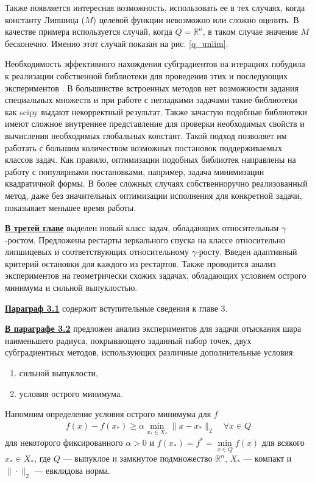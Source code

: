 Также появляется интересная возможность, использовать ее в тех случаях, когда константу Липшица ($M$) целевой функции невозможно или сложно оценить. В качестве примера используется случай, когда $Q = \mathbb{R}^n$, в таком случае значение $M$ бесконечно. Именно этот случай показан на рис. \ref{q_unlim}. 

Необходимость эффективного нахождения субградиентов на итерациях побудила к реализации собственной библиотеки для проведения этих и последующих экспериментов \cite{mygit}. В большинстве встроенных методов нет возможности задания специальных  множеств и при работе с негладкими задачами такие библиотеки как scipy выдают некорректный результат. Также зачастую подобные библиотеки имеют сложное внутреннее представление для проверки необходимых свойств и вычисления необходимых глобальных констант. Такой подход позволяет им работать с большим количеством возможных постановок поддерживаемых классов задач. Как правило, оптимизации подобных библиотек направлены на работу с популярными постановками, например, задача минимизации квадратичной формы. В более сложных случаях собственноручно реализованный метод, даже без значительных оптимизации исполнения для конкретной задачи, показывает меньшее время работы. 


\underline{\textbf{В третей главе}} выделен новый класс задач, обладающих относительным $\gamma$-ростом. Предложены рестарты зеркального спуска на классе относительно липшицевых и соответствующих относительному $\gamma$-росту. Введен адаптивный критерий остановки для каждого из рестартов. Также проводится анализ экспериментов на геометрически схожих задачах, обладающих условием острого минимума и сильной выпуклостью. 

\underline{\textbf{Параграф 3.1}} содержит вступительные сведения к главе 3. 

\underline{\textbf{В параграфе 3.2}} предложен анализ экспериментов для задачи отыскания шара наименьшего радиуса, покрывающего заданный набор точек, двух субградиентных методов, использующих различные дополнительные условия:
\begin{enumerate}
    \item сильной выпуклости,
    \item условия острого минимума.
\end{enumerate}

Напомним определение условия острого минимума для $f$
\begin{gather}\label{sm}
    f(x) - f(x_*) \geq \alpha \min_{x_* \in X_*} \|x- x_*\|_2 \quad \forall x \in Q
\end{gather}
для некоторого фиксированного $\alpha >0$ и $f(x_*) = f^* = \min\limits_{x\in Q} f(x)$ для всякого $x_* \in X_*$, где $Q$ --- выпуклое и замкнутое подмножество $\mathbb{R}^n$, $X_*$ --- компакт и $\|\cdot\|_2$ --- евклидова норма. 


